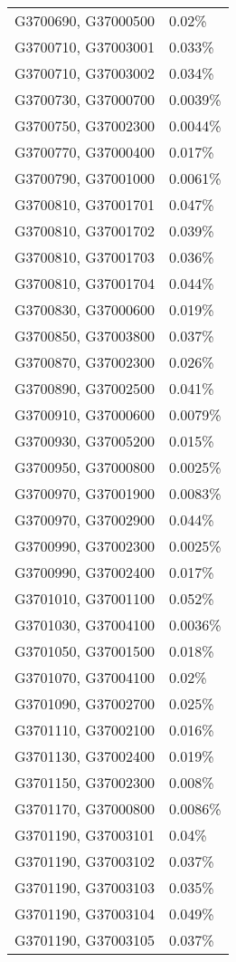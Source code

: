 \begin{longtable}[]{@{}ll@{}}
G3700690, G37000500 & 0.02\% \\
G3700710, G37003001 & 0.033\% \\
G3700710, G37003002 & 0.034\% \\
G3700730, G37000700 & 0.0039\% \\
G3700750, G37002300 & 0.0044\% \\
G3700770, G37000400 & 0.017\% \\
G3700790, G37001000 & 0.0061\% \\
G3700810, G37001701 & 0.047\% \\
G3700810, G37001702 & 0.039\% \\
G3700810, G37001703 & 0.036\% \\
G3700810, G37001704 & 0.044\% \\
G3700830, G37000600 & 0.019\% \\
G3700850, G37003800 & 0.037\% \\
G3700870, G37002300 & 0.026\% \\
G3700890, G37002500 & 0.041\% \\
G3700910, G37000600 & 0.0079\% \\
G3700930, G37005200 & 0.015\% \\
G3700950, G37000800 & 0.0025\% \\
G3700970, G37001900 & 0.0083\% \\
G3700970, G37002900 & 0.044\% \\
G3700990, G37002300 & 0.0025\% \\
G3700990, G37002400 & 0.017\% \\
G3701010, G37001100 & 0.052\% \\
G3701030, G37004100 & 0.0036\% \\
G3701050, G37001500 & 0.018\% \\
G3701070, G37004100 & 0.02\% \\
G3701090, G37002700 & 0.025\% \\
G3701110, G37002100 & 0.016\% \\
G3701130, G37002400 & 0.019\% \\
G3701150, G37002300 & 0.008\% \\
G3701170, G37000800 & 0.0086\% \\
G3701190, G37003101 & 0.04\% \\
G3701190, G37003102 & 0.037\% \\
G3701190, G37003103 & 0.035\% \\
G3701190, G37003104 & 0.049\% \\
G3701190, G37003105 & 0.037\% \\

\end{longtable}
